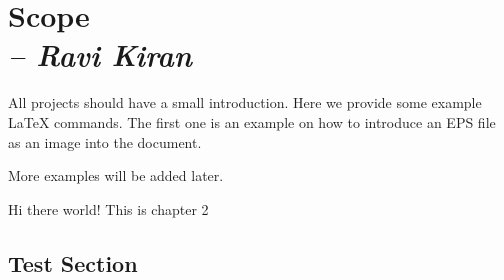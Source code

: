 \chapter{Scope \\
\small{\textit{-- Ravi Kiran}}
\label{Chapter::Scope}}

All projects should have a small introduction.  Here we provide some
example LaTeX commands.  The first one is an example on how to
introduce an EPS file as an image into the document.


More examples will be added later.

\newpage

Hi there world!
This is chapter 2
\section{Test Section \label{Section::Test Section}}